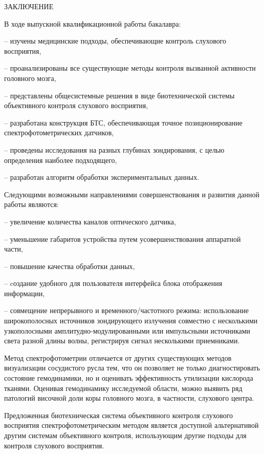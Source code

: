 \newpage
\begin{center}
ЗАКЛЮЧЕНИЕ
\end{center}
\vspace{6mm}


В ходе выпускной квалификационной работы бакалавра:

– изучены медицинские подходы, обеспечивающие контроль слухового восприятия,

– проанализированы все существующие методы контроля вызванной активности головного мозга,

– представлены общесистемные решения в виде биотехнической системы объективного контроля слухового восприятия,

– разработана конструкция БТС, обеспечивающая точное позиционирование спектрофотометрических датчиков,

– проведены исследования на разных глубинах зондирования, с целью определения наиболее подходящего,

– разработан алгоритм обработки экспериментальных данных.

Следующими возможными направлениями совершенствования и развития данной работы являются:

– увеличение количества каналов оптического датчика,
    
– уменьшение габаритов устройства путем усовершенствования аппаратной части,
   
– повышение качества обработки данных,
    
– cоздание удобного для пользователя интерфейса блока отображения информации,
   
– совмещение непрерывного и временного/частотного режима: использование  широкополосных  источников зондирующего излучения  совместно  с  несколькими  узкополосными амплитудно-модулированными  или импульсными источниками света разной длины волны, регистрируя сигнал несколькими приемниками.

Метод спектрофотометрии отличается от других существующих методов визуализации сосудистого русла тем, что он позволяет не только диагностировать состояние гемодинамики, но и оценивать эффективность утилизации кислорода тканями. Оценивая гемодинамику исследуемой области, можно выявить ряд патологий височной доли коры головного мозга, в частности, слухового центра.

Предложенная биотехническая система объективного контроля слухового восприятия спектрофотометрическим методом является доступной альтернативой другим системам объективного контроля, использующим другие подходы для контроля слухового восприятия.

